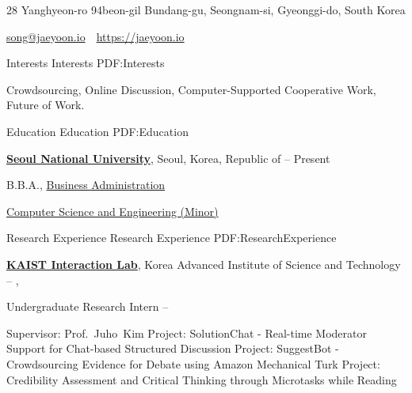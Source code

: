 \documentclass[letterpaper,MMMyyyy,nonstopmode]{template}
\newcommand{\CVAuthor}{Jaeyoon Song}
\newcommand{\CVWebpage}{https://jaeyoon.io}
\begin{document}

\Title{\CVAuthor}

\Gap
\begin{SubTitle}
  28 Yanghyeon-ro 94beon-gil Bundang-gu, Seongnam-si, Gyeonggi-do, South Korea
  \par

  \href{mailto:song@jaeyoon.io}
  {song@jaeyoon.io}
  \,\SubBulletSymbol\,
  \href{\CVWebpage}
  {\url{\CVWebpage}}
\end{SubTitle}
  


\begin{Body}

  
\BigGap
\Section
{Interests}
{Interests}
{PDF:Interests}

\Entry
Crowdsourcing,
Online Discussion,
Computer-Supported Cooperative Work,
Future of Work.



\BigGap
\Section
{Education}
{Education}
{PDF:Education}

\Entry
\href{http://www.snu.ac.kr}
{\textbf{Seoul National University}},
Seoul, Korea, Republic of
\hfill
{} --
Present

\Gap
\BulletItem
B.B.A.,
\href{http://cba.snu.ac.kr}
{Business Administration}

\Gap
\BulletItem
\href{http://cse.snu.ac.kr}
{Computer Science and Engineering (Minor)}

\BigGap
\Section
{Research Experience}
{Research Experience}
{PDF:ResearchExperience}

\Entry
\href{https://www.kixlab.org}
{\textbf{KAIST Interaction Lab}},
Korea Advanced Institute of Science and Technology
\hfill
{} -- 
,

\Gap
\BulletItem
Undergraduate Research Intern
\hfill
{} --

\Gap
\begin{Detail}
\SubBulletItem
Supervisor:
Prof.~Juho~Kim
\SubBulletItem
Project:
SolutionChat - Real-time Moderator Support for Chat-based Structured Discussion
\SubBulletItem
Project:
SuggestBot - Crowdsourcing Evidence for Debate using Amazon Mechanical Turk
\SubBulletItem
Project:
Credibility Assessment and Critical Thinking through Microtasks while Reading
\end{Detail}


\end{Body}
\end{document}
